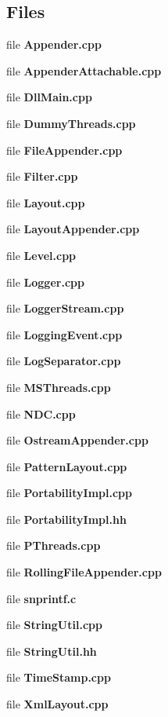 \subsection*{Files}
\begin{DoxyCompactItemize}
\item 
file {\bf Appender.\-cpp}
\item 
file {\bf Appender\-Attachable.\-cpp}
\item 
file {\bf Dll\-Main.\-cpp}
\item 
file {\bf Dummy\-Threads.\-cpp}
\item 
file {\bf File\-Appender.\-cpp}
\item 
file {\bf Filter.\-cpp}
\item 
file {\bf Layout.\-cpp}
\item 
file {\bf Layout\-Appender.\-cpp}
\item 
file {\bf Level.\-cpp}
\item 
file {\bf Logger.\-cpp}
\item 
file {\bf Logger\-Stream.\-cpp}
\item 
file {\bf Logging\-Event.\-cpp}
\item 
file {\bf Log\-Separator.\-cpp}
\item 
file {\bf M\-S\-Threads.\-cpp}
\item 
file {\bf N\-D\-C.\-cpp}
\item 
file {\bf Ostream\-Appender.\-cpp}
\item 
file {\bf Pattern\-Layout.\-cpp}
\item 
file {\bf Portability\-Impl.\-cpp}
\item 
file {\bf Portability\-Impl.\-hh}
\item 
file {\bf P\-Threads.\-cpp}
\item 
file {\bf Rolling\-File\-Appender.\-cpp}
\item 
file {\bf snprintf.\-c}
\item 
file {\bf String\-Util.\-cpp}
\item 
file {\bf String\-Util.\-hh}
\item 
file {\bf Time\-Stamp.\-cpp}
\item 
file {\bf Xml\-Layout.\-cpp}
\end{DoxyCompactItemize}
